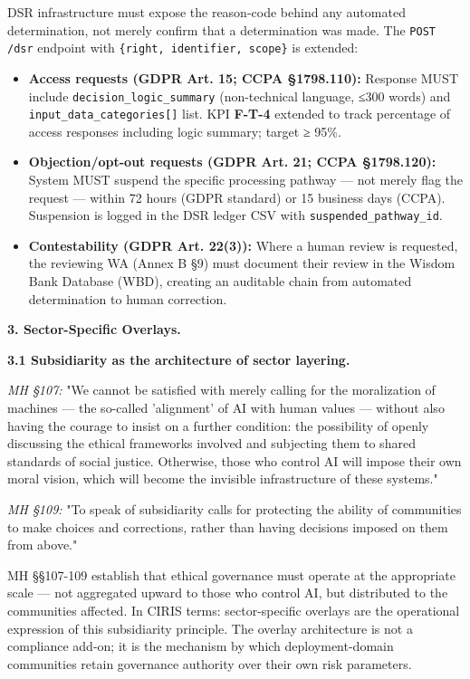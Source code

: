 \documentclass[11pt]{article}
\begin{document}
DSR infrastructure must expose the reason-code behind any automated determination, not merely confirm that a determination was made. The \texttt{POST /dsr} endpoint with \texttt{\{right, identifier, scope\}} is extended:


\begin{itemize}\setlength\itemsep{0pt}
\item \textbf{Access requests (GDPR Art. 15; CCPA §1798.110):} Response MUST include \texttt{decision\_logic\_summary} (non-technical language, ≤300 words) and \texttt{input\_data\_categories[]} list. KPI \textbf{F-T-4} extended to track percentage of access responses including logic summary; target ≥ 95\%.
\item \textbf{Objection/opt-out requests (GDPR Art. 21; CCPA §1798.120):} System MUST suspend the specific processing pathway — not merely flag the request — within 72 hours (GDPR standard) or 15 business days (CCPA). Suspension is logged in the DSR ledger CSV with \texttt{suspended\_pathway\_id}.
\item \textbf{Contestability (GDPR Art. 22(3)):} Where a human review is requested, the reviewing WA (Annex B §9) must document their review in the Wisdom Bank Database (WBD), creating an auditable chain from automated determination to human correction.
\end{itemize}


\textbf{3. Sector-Specific Overlays.}


\textbf{3.1 Subsidiarity as the architecture of sector layering.}


\textit{MH §107:} "We cannot be satisfied with merely calling for the moralization of machines — the so-called 'alignment' of AI with human values — without also having the courage to insist on a further condition: the possibility of openly discussing the ethical frameworks involved and subjecting them to shared standards of social justice. Otherwise, those who control AI will impose their own moral vision, which will become the invisible infrastructure of these systems."


\textit{MH §109:} "To speak of subsidiarity calls for protecting the ability of communities to make choices and corrections, rather than having decisions imposed on them from above."


MH §§107-109 establish that ethical governance must operate at the appropriate scale — not aggregated upward to those who control AI, but distributed to the communities affected. In CIRIS terms: sector-specific overlays are the operational expression of this subsidiarity principle. The overlay architecture is not a compliance add-on; it is the mechanism by which deployment-domain communities retain governance authority over their own risk parameters.
\end{document}
